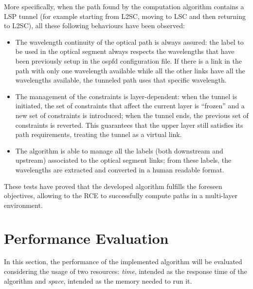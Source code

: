 \documentclass[10pt,a4paper]{report}
\begin{document}
More specifically, when the path found by the computation algorithm
contains a LSP tunnel (for example starting from L2SC, moving to LSC
and then returning to L2SC), all these following behaviours have been
observed:
\begin{itemize}
\item The wavelength continuity of the optical path is always assured:
  the label to be used in the optical segment always respects the
  wavelengths that have been previously setup in the ospfd
  configuration file. If there is a link in the path with only one
  wavelength available while all the other links have all the
  wavelengths available, the tunneled path uses that specific
  wavelength.
\item The management of the constraints is layer-dependent: when the
  tunnel is initiated, the set of constraints that affect the current
  layer is ``frozen'' and a new set of constraints is introduced; when
  the tunnel ends, the previous set of constraints is reverted. This
  guarantees that the upper layer still satisfies its path
  requirements, treating the tunnel as a virtual link.
\item The algorithm is able to manage all the labels (both downstream
  and upstream) associated to the optical segment links; from these
  labels, the wavelengths are extracted and converted in a human
  readable format.
\end{itemize}

These tests have proved that the developed algorithm fulfills the
foreseen objectives, allowing to the RCE to successfully compute paths
in a multi-layer environment.

\section{Performance Evaluation}

In this section, the performance of the implemented algorithm will be
evaluated considering the usage of two resources: \textit{time},
intended as the response time of the algorithm and \textit{space},
intended as the memory needed to run it.
\end{document}
